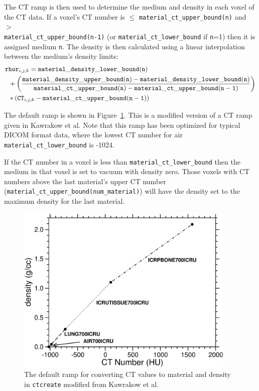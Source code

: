 \documentclass[12pt,twoside]{article}      %
\newcommand{\indexm}[1]{\index{#1}}
\begin{document}
The CT ramp is then used to determine the medium and density in each voxel of the CT data.
\indexm{CT!ramp}
If a voxel's CT number is $\leq$ {\tt material\_ct\_upper\_bound(n)} and
$>$ \\
{\tt material\_ct\_upper\_bound(n-1)} (or {\tt material\_ct\_lower\_bound} if
{\tt n}=1)
then it is assigned medium {\tt n}. The density is then calculated using a linear
interpolation between the medium's density limits:
\begin{align}
{\tt r}&{\tt hor}_{i,j,k} = {\tt material\_density\_lower\_bound(n)} \nonumber \\
             &+\left(\frac{{\tt material\_density\_upper\_bound(n)}-
 {\tt material\_density\_lower\_bound(n)}}
{{\tt material\_ct\_upper\_bound(n)}-
 {\tt material\_ct\_upper\_bound(n-1)}}\right)        \\
        &*({\tt CT}_{i,j,k}-{\tt material\_ct\_upper\_bound(n-1)}) \nonumber
\end{align}

The default ramp is shown in Figure~\ref{fig_ct02}. This is a modified version of
\indexm{CT!ramp}
a CT ramp given in Kawrakow et al\cite{Ka96a}.  Note that this ramp has been
optimized for typical DICOM format data, where the lowest CT number for air
{\tt material\_ct\_lower\_bound} is -1024.

If the CT number in a voxel is less than {\tt material\_ct\_lower\_bound} then
the medium in that voxel is set to vacuum with density zero.
Those voxels with CT numbers above the
last material's upper CT number ({\tt material\_ct\_upper\_bound(num\_material)})
will have the density set to the maximum
density for the last material.

\begin{figure}[H]
\begin{center}
\includegraphics[width=10.5cm]{figures/CTramp}
\caption{The default ramp for converting CT values to material and
density in {\tt ctcreate} modified from Kawrakow et al\cite{Ka96a}.}
\label{fig_ct02}
\end{center}
\end{figure}
\indexm{CT!ramp}
\end{document}
